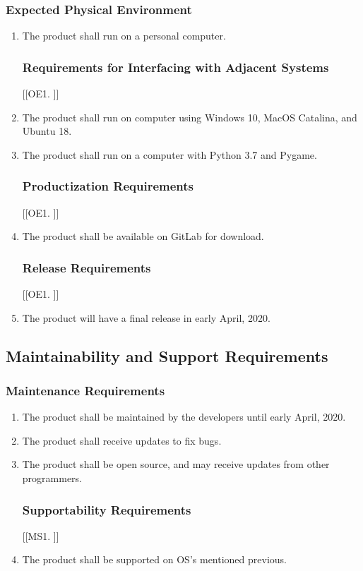 \documentclass[12pt, titlepage]{article}
\begin{document}
\subsubsection{Expected Physical Environment}
\begin{enumerate}[{OE}1. ]
    \item The product shall run on a personal computer.

\subsubsection{Requirements for Interfacing with Adjacent Systems}
[{[{OE}1. ]}]
    \item The product shall run on computer using Windows 10, MacOS Catalina, and Ubuntu 18.
    \item The product shall run on a computer with Python 3.7 and Pygame.

\subsubsection{Productization Requirements}
[{[{OE}1. ]}]
    \item The product shall be available on GitLab for download.

\subsubsection{Release Requirements}
[{[{OE}1. ]}]
    \item The product will have a final release in early April, 2020.
\end{enumerate}



\subsection{Maintainability and Support Requirements}

\subsubsection{Maintenance Requirements}
\begin{enumerate}[{MS}1. ]
    \item The product shall be maintained by the developers until early April, 2020.
    \item The product shall receive updates to fix bugs.
    \item The product shall be open source, and may receive updates from other programmers.

\subsubsection{Supportability Requirements}
[{[{MS}1. ]}]
    \item The product shall be supported on OS's mentioned previous.
\end{enumerate}
\end{document}
